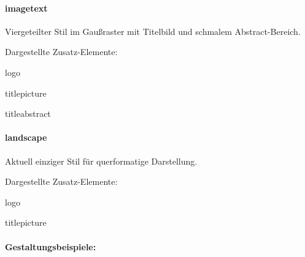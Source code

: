   \begin{minipage}[t]{0.33\textwidth}
    \null\centering\sffamily
  \end{minipage}
  \hfill
  \begin{minipage}[t]{0.6\textwidth}
    \paragraph{imagetext}
    
    Viergeteilter Stil im Gaußraster mit Titelbild und schmalem Abstract-Bereich.
    \par\bigskip
    \par\bigskip
    Dargestellte Zusatz-Elemente:
    \begin{compactitem}\ttfamily
      \item logo
      \item titlepicture
      \item titleabstract
    \end{compactitem}
  \end{minipage}

  \begin{minipage}[t]{0.33\textwidth}
    \null\centering\sffamily
  \end{minipage}%
  \hfill
  \begin{minipage}[t]{0.6\textwidth}
    \paragraph{landscape}
    Aktuell einziger Stil für querformatige Darstellung.
    \par\bigskip
    \par\bigskip
    Dargestellte Zusatz-Elemente:
    \begin{compactitem}\ttfamily
      \item logo
      \item titlepicture
    \end{compactitem}
  \end{minipage}
  
\paragraph{Gestaltungsbeispiele:}\hfill

